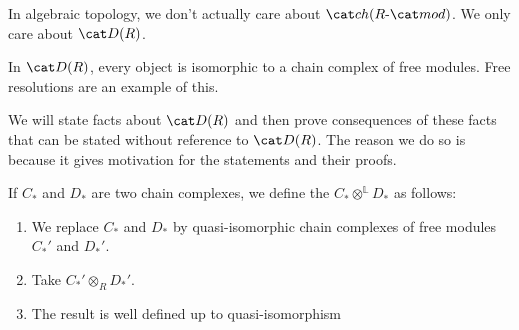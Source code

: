 \documentclass{standalone}
\begin{document}
In algebraic topology, we don't actually care about \(\cchRmod\).
We only care about \(\der(R)\).

\begin{example}
  In \(\der(R)\), every object is isomorphic to
  a chain complex of free modules.
  Free resolutions are an example of this.
\end{example}

We will state facts about \(\der(R)\) and then
prove consequences of these facts that can be stated
without reference to \(\der(R)\).
The reason we do so is because it gives motivation for the statements
and their proofs.

\begin{example}
  If \(C_*\) and \(D_*\) are two chain complexes,
  we define the 
  \(C_* \otimes^{\mathbb L} D_*\) as follows:
  \begin{enumerate}[nosep]
    \item We replace \(C_*\) and \(D_*\) by quasi-isomorphic chain complexes
          of free modules \(C_*'\) and \(D_*'\).
    \item Take \(C_*' \otimes_R D_*'\).
    \item The result is well defined up to quasi-isomorphism
  \end{enumerate}
\end{example}
\end{document}
